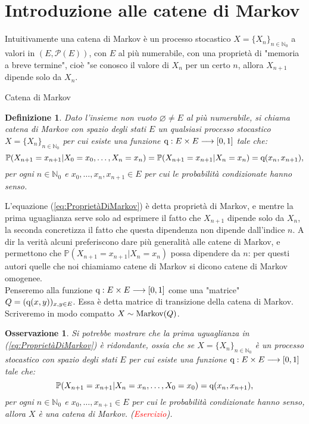 \documentclass[11pt]{book}
\theoremstyle{Definizione}
\newtheorem*{mydef}{Definizione}
\theoremstyle{TeoremaProposizioneLemmaCorollario}
\theoremstyle{OsservazioneNota}
\newtheorem{myobs}{Osservazione}[section]
\newcommand{\N}{\mathbb{N}}
\renewcommand{\P}{\mathbb{P}}
\newcommand{\q}{\textup{q}}
\begin{document}
\section{Introduzione alle catene di Markov}
Intuitivamente una catena di Markov è un processo stocastico $X = \{X_n\}_{n\in \N_0}$ a valori in $(E,\mathcal{P}(E))$, con $E$ al più numerabile, con una proprietà di "memoria a breve termine", cioè "se conosco il valore di $X_n$ per un certo $n$, allora $X_{n+1}$ dipende solo da $X_n$.
\begin{boxdef}{Catena di Markov}
\begin{mydef}
Dato l'insieme non vuoto $\varnothing \neq E$ al più numerabile, si chiama catena di Markov con spazio degli stati $E$ un qualsiasi processo stocastico $X = \{X_n\}_{n\in \N_0}$ per cui esiste una funzione $\q:E\times E \longrightarrow [0,1]$ tale che:
\begin{equation}\label{eq:ProprietàDiMarkov}
\P(X_{n+1} = x_{n+1} | X_0 = x_0,\dots,X_n = x_n) = \P(X_{n+1} = x_{n+1}| X_n = x_n) = \q(x_n,x_{n+1}),
\end{equation}
per ogni $n\in \N_0$ e $x_0,\dots,x_n,x_{n+1}\in E$ per cui le probabilità condizionate hanno senso.
\end{mydef}
\end{boxdef}
\noindent
L'equazione (\ref{eq:ProprietàDiMarkov}) è detta proprietà di Markov, e mentre la prima uguaglianza serve solo ad esprimere il fatto che $X_{n+1}$ dipende solo da $X_n$, la seconda concretizza il fatto che questa dipendenza non dipende dall'indice $n$. A dir la verità alcuni preferiscono dare più generalità alle catene di Markov, e permettono che $\P(X_{n+1} = x_{n+1} | X_n = x_n)$ possa dipendere da $n$: per questi autori quelle che noi chiamiamo catene di Markov si dicono catene di Markov omogenee.\\
Penseremo alla funzione $\q:E\times E \longrightarrow [0,1]$ come una "matrice" $Q = (\q(x,y))_{x,y\in E}$. Essa è detta matrice di transizione della catena di Markov. Scriveremo in modo compatto $X \sim \textup{Markov}(Q)$.
\begin{myobs}
Si potrebbe mostrare che la prima uguaglianza in (\ref{eq:ProprietàDiMarkov}) è ridondante, ossia che se $X = \{X_n\}_{n \in \N_0}$ è un processo stocastico con spazio degli stati $E$ per cui esiste una funzione $\q:E\times E \longrightarrow [0,1]$ tale che:
$$
\P(X_{n+1} = x_{n+1} | X_n = x_n,\dots,X_0 = x_0) = \q(x_n,x_{n+1}),
$$
per ogni $n\in \N_0$ e $x_0,\dots,x_{n+1}\in E$ per cui le probabilità condizionate hanno senso, allora $X$ è una catena di Markov. (\textcolor{red}{Esercizio}).
\end{myobs}
\end{document}
